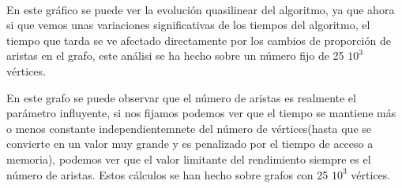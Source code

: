 \documentclass[a4paper]{llncs}
\begin{document}
\\[0.5cm ]
En este gráfico se puede ver la evolución quasilinear del algoritmo, ya que ahora si que vemos unas variaciones significativas de los tiempos del algoritmo, el tiempo que tarda se ve afectado directamente por los cambios de proporción de aristas en el grafo, este análisi se ha hecho sobre un número fijo de 25 \cdot $10^3$ vértices.


\medskip
En este grafo se puede observar que el número de aristas es realmente el parámetro influyente, si nos fijamos podemos ver que el tiempo se mantiene más o menos constante independientemnete del número de vértices(hasta que se convierte en un valor muy grande y es penalizado por el tiempo de acceso a memoria), podemos ver que el valor limitante del rendimiento siempre es el número de aristas. Estos cálculos se han hecho sobre grafos con 25 \cdot $10^3$ vértices.
\end{document}
